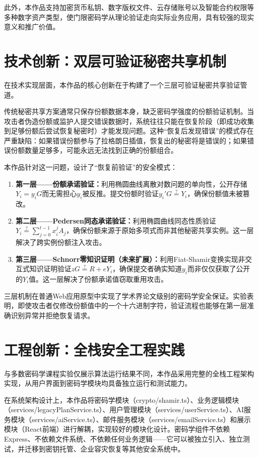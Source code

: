 \documentclass[UTF8,a4paper,zihao=-4,openany]{ctexrep}
\begin{document}
此外，本作品支持加密货币私钥、数字版权文件、云存储账号以及智能合约权限等多种数字资产类型，使门限密码学从理论验证走向实际业务应用，具有较强的现实意义和推广价值。

\section{技术创新：双层可验证秘密共享机制}

在技术实现层面，本作品的核心创新在于构建了一个三层可验证秘密共享验证管道。

传统秘密共享方案通常只保存份额数据本身，缺乏密码学强度的份额验证机制。当攻击者伪造份额或监护人提交错误数据时，系统往往只能在恢复阶段（即成功收集到足够份额后尝试恢复秘密时）才能发现问题。这种“恢复后发现错误”的模式存在严重缺陷：如果错误份额参与了拉格朗日插值，恢复出的秘密将是错误的；如果错误份额数量足够多，可能永远无法找到正确的份额组合。

本作品针对这一问题，设计了“恢复前验证”的安全模式：
\begin{enumerate}
  \item \textbf{第一层——份额承诺验证：}利用椭圆曲线离散对数问题的单向性，公开存储$Y_i=y_iG$而无需担心$y_i$被反推。提交份额时验证$y_i'G \stackrel{?}{=} Y_i$，确保份额值未被篡改。
  \item \textbf{第二层——Pedersen同态承诺验证：}利用椭圆曲线同态性质验证$Y_i \stackrel{?}{=} \sum_{j=0}^{t-1} x_i^j A_j$，确保份额来源于原始多项式而非其他秘密共享实例。这一层解决了跨实例份额注入攻击。
  \item \textbf{第三层——Schnorr零知识证明（未来扩展）：}利用Fiat-Shamir变换实现非交互式知识证明验证$zG \stackrel{?}{=} R + eY_i$，确保提交者确实知道$y_i$而非仅仅获取了公开的$Y_i$值。这一层解决了份额承诺值窃取重用攻击。
\end{enumerate}

三层机制在普通Web应用原型中实现了学术界论文级别的密码学安全保证。实验表明，即使攻击者仅修改份额值中的一个十六进制字符，验证流程也能够在第一层准确识别异常并拒绝恢复请求。

\section{工程创新：全栈安全工程实践}

与多数密码学课程实验仅展示算法运行结果不同，本作品采用完整的全栈工程架构实现，从用户界面到密码学模块均具备独立运行和测试能力。

在系统架构设计上，本作品将密码学模块（crypto/shamir.ts）、业务逻辑模块（services/legacyPlanService.ts）、用户管理模块（services/userService.ts）、AI服务模块（services/aiService.ts）、邮件服务模块（services/emailService.ts）和展示模块（React前端）进行解耦，实现较好的模块化设计。密码学组件不依赖Express、不依赖文件系统、不依赖任何业务逻辑——它可以被独立引入、独立测试，并迁移到密钥托管、企业容灾恢复等其他安全系统中。
\end{document}

